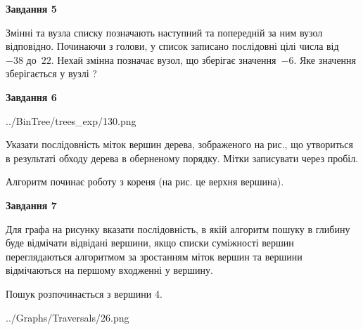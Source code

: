 \documentclass[12pt, ukrainian]{article}
\begin{document}
{\begin {large}
{\begin {center}\textbf{Завдання 5}\end {center}}\par
Змінні  та  вузла списку позначають наступний та попередній за ним вузол відповідно. Починаючи з голови, у список записано послідовні цілі числа від~$-38$ до~$22$. Нехай змінна  позначає вузол, що зберігає значення~$-6$.
Яке значення зберігається у вузлі  ?\par
\newpage

{\begin {center}\textbf{Завдання 6}\end {center}}\par

\begin{center}
	{../BinTree/trees_exp/130.png}
\end{center}
Указати послідовність міток вершин дерева, зображеного на рис., що утвориться в результаті обходу дерева в оберненому порядку. Мітки записувати через пробіл.\par Алгоритм починає роботу з кореня (на рис. це верхня вершина).\par
\newpage

{\begin {center}\textbf{Завдання 7}\end {center}}\par
Для графа на рисунку вказати послідовність, в якій алгоритм пошуку в глибину буде відмічати відвідані вершини, якщо списки суміжності вершин переглядаються алгоритмом за зростанням міток вершин та вершини відмічаються на першому вход\-женні у вершину.\par
Пошук розпочинається з вершини 4.\par

\begin{center}
	{../Graphs/Traversals/26.png}
\end{center}\par
\newpage


\end{large}}
\end{document}
